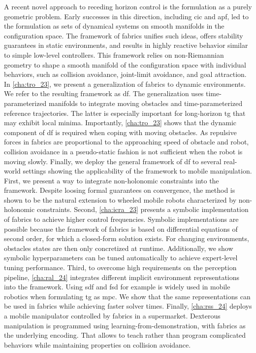 A recent novel approach to
receding horizon control is the formulation as a purely geometric problem.
Early successes in this direction, including \ac{cic} and \ac{apf}, led to the
formulation as sets of dynamical systems on smooth manifolds in the
configuration space. The framework of \ac{fabrics} unifies such ideas, 
offers stability guarantees in static environments, and results in highly
reactive behavior similar to simple low-level controllers.
This framework relies on non-Riemannian
geometry to shape a smooth manifold of the configuration space with individual
behaviors, such as collision avoidance, joint-limit avoidance, and goal 
attraction. In \cref{cha:tro_23}, we present a generalization of
\ac{fabrics} to dynamic environments. We refer to the resulting framework as
\ac{df}. The generalization uses time\hyp{}parameterized manifolds to integrate 
moving obstacles and time\hyp{}parameterized reference trajectories. The latter is
especially important for long-horizon \ac{tg} that may exhibit local minima.
Importantly, \cref{cha:tro_23} shows that the dynamic component of \ac{df}
is required when coping with moving obstacles. As repulsive forces 
in \ac{fabrics} are proportional to the approaching speed of obstacle and robot,
collision avoidance in a pseudo-static fashion is not sufficient when the robot
is moving slowly.
Finally, we deploy the general framework of \ac{df} to several real-world
settings showing the applicability of the framework to mobile manipulation.
First, we present a way to
integrate non\hyp{}holonomic constraints into the framework. Despite loosing
formal guarantees on convergence, the method is shown to be the natural extension
to wheeled mobile robots characterized by non\hyp{}holonomic constraints.
Second, \cref{cha:icra_23} presents a symbolic
implementation of \ac{fabrics} to achieve higher control frequencies.
Symbolic implementations are possible because the framework of \ac{fabrics}
is based on differential equations of second order, for which a closed-form
solution exists. For changing environments, obstacles states are then only
concretized at runtime.
Additionally, we show symbolic 
hyperparameters can be tuned automatically to achieve expert-level tuning performance.
Third, to overcome high requirements on the perception pipeline, \cref{cha:ral_24}
integrates different implicit environment representations into the framework.
Using \ac{sdf} and \ac{fsd} for example is widely used in mobile robotics when
formulating \ac{tg} as \ac{mpc}. We show that the same representations can be
used in \ac{fabrics} while achieving faster solver times.
Finally, 
\cref{cha:rss_24} deploys a mobile manipulator controlled by \ac{fabrics}
in a supermarket. Dexterous manipulation is programmed using
learning-from-demonstration, with \ac{fabrics} as the underlying encoding.
That allows to teach rather than program complicated behaviors while
maintaining properties on collision avoidance.

